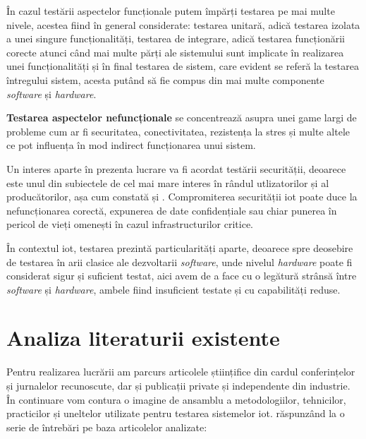 În cazul testării aspectelor funcționale putem împărți testarea pe mai multe nivele, acestea fiind în general considerate: testarea unitară, adică testarea izolata a unei singure funcționalități, testarea de integrare, adică testarea funcționării corecte atunci când mai multe părți ale sistemului sunt implicate în realizarea unei funcționalități și în final testarea de sistem, care evident se referă la testarea întregului sistem, acesta putând să fie compus din mai multe componente \textit{software} și \textit{hardware}.

\textbf{Testarea aspectelor nefuncționale} se concentrează asupra unei game largi de probleme cum ar fi securitatea, conectivitatea, rezistența la stres și multe altele ce pot influența în mod indirect funcționarea unui sistem.


Un interes aparte în prezenta lucrare va fi acordat testării securității, deoarece este unul din subiectele de cel mai mare interes în rândul utlizatorilor și al producătorilor, așa cum constată \cite{Ahmed2019} și \cite{Lee2015}. Compromiterea securității \acrshort{iot} poate duce la nefuncționarea corectă, expunerea de date confidențiale sau chiar punerea în pericol de vieți omenești în cazul infrastructurilor critice.


În contextul \acrshort{iot}, testarea prezintă particularități aparte, deoarece spre deosebire de testarea în arii clasice ale dezvoltarii \textit{software}, unde nivelul \textit{hardware} poate fi considerat sigur și suficient testat, aici avem de a face cu o legătură strânsă între \textit{software} și \textit{hardware}, ambele fiind insuficient testate și cu capabilități reduse.


\section{Analiza literaturii existente}

Pentru realizarea lucrării am parcurs articolele științifice din cardul conferințelor și jurnalelor recunoscute, dar și publicații private și independente din industrie. În continuare vom contura o imagine de ansamblu a metodologiilor, tehnicilor, practicilor și uneltelor utilizate pentru testarea sistemelor \acrshort{iot}. răspunzând la o serie de întrebări pe baza articolelor analizate: 

